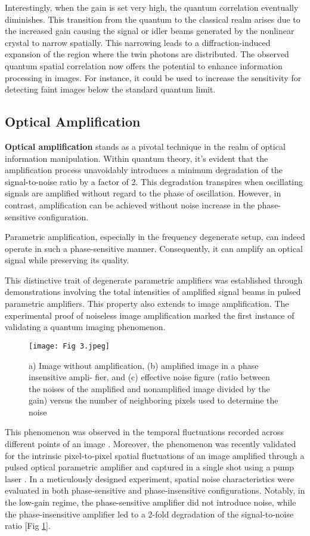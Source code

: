 \documentclass{article}
\begin{document}
Interestingly, when the gain is set very high, the quantum correlation eventually diminishes. This transition from the quantum to the classical realm arises due to the increased gain causing the signal or idler beams generated by the nonlinear crystal to narrow spatially. This narrowing leads to a diffraction-induced expansion of the region where the twin photons are distributed. The observed quantum spatial correlation now offers the potential to enhance information processing in images. For instance, it could be used to increase the sensitivity for detecting faint images below the standard quantum limit.
\subsection{Optical Amplification}
\textbf{Optical amplification} stands as a pivotal technique in the realm of optical information manipulation. Within quantum theory, it's evident that the amplification process unavoidably introduces a minimum degradation of the signal-to-noise ratio by a factor of 2. This degradation transpires when oscillating signals are amplified without regard to the phase of oscillation. However, in contrast, amplification can be achieved without noise increase in the phase-sensitive configuration.

Parametric amplification, especially in the frequency degenerate setup, can indeed operate in such a phase-sensitive manner. Consequently, it can amplify an optical signal while preserving its quality.

This distinctive trait of degenerate parametric amplifiers was established through demonstrations involving the total intensities of amplified signal beams in pulsed parametric amplifiers. This property also extends to image amplification. The experimental proof of noiseless image amplification marked the first instance of validating a quantum imaging phenomenon. 
\begin{figure}[h]
    \centering
    \texttt{[image: Fig 3.jpeg]}
    \caption{a) Image without amplification, (b) amplified image in a phase insensitive ampli-
fier, and (c) effective noise figure (ratio between the noises of the amplified and nonamplified
image divided by the gain) versus the number of neighboring pixels used to determine the noise}
    \label{hi}
\end{figure}

This phenomenon was observed in the temporal fluctuations recorded across different points of an image \cite{PhysRevLett.83.1938}. Moreover, the phenomenon was recently validated for the intrinsic pixel-to-pixel spatial fluctuations of an image amplified through a pulsed optical parametric amplifier and captured in a single shot using a pump laser \cite{article}. In a meticulously designed experiment, spatial noise characteristics were evaluated in both phase-sensitive and phase-insensitive configurations. Notably, in the low-gain regime, the phase-sensitive amplifier did not introduce noise, while the phase-insensitive amplifier led to a 2-fold degradation of the signal-to-noise ratio [Fig \ref{hi}]. 
\end{document}
